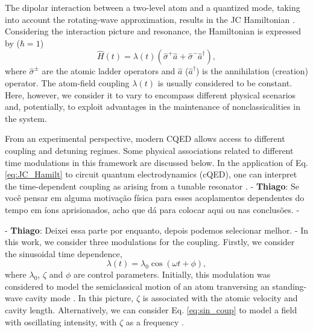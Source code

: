 \documentclass[aps,pre,superscriptaddress,twocolumn,10pt]{revtex4-2}
\newcommand{\ts}[1]{{\color{red}- \textbf{Thiago}: #1 - }}
\begin{document}
The dipolar interaction between a two-level atom and a quantized mode, taking into account the rotating-wave approximation, results in the JC Hamiltonian \cite{Scully1997,GERRY2005}.
Considering the interaction picture and resonance, the Hamiltonian is expressed by ($\hbar=1$)
\begin{equation} 
\label{eq:JC_Hamilt}
    \hat{H}(t) = 
      \lambda(t) ( \hat{\sigma}^{+}\hat{a} +
    \hat{\sigma}^{-}\hat{a}^{\dagger}), 
\end{equation}
where $\hat{\sigma}^{\pm}$ are the atomic ladder operators and $\hat{a}$ ($\hat{a}^\dagger$) is  the annihilation (creation) operator.
The atom-field coupling $\lambda(t)$ is usually considered to be constant. 
Here, however, we consider it to vary to encompass different physical scenarios and, potentially, to exploit advantages in the maintenance of nonclassicalities in the system.

From an experimental perspective, modern CQED allows access to different coupling \cite{LARSON2021} and detuning \cite{Brune1996,Sayrin2011} regimes. Some physical associations related to different time modulations in this framework are discussed below.
In the application of Eq. \eqref{eq:JC_Hamilt} to circuit quantum electrodynamics (cQED), one can interpret the time-dependent coupling as arising from a tunable resonator \cite{Maldonado-Mundo2012,Yamamoto2008,Gambetta2011,Srinivasan2011,Yin2013,Srinivasan2014,Zeytinoglu2015}.
\ts{Se você pensar em alguma motivação física para esses acoplamentos dependentes do tempo em íons aprisionados, acho que dá para colocar aqui ou nas conclusões.}

\ts{Deixei essa parte por enquanto, depois podemos selecionar melhor.}
 In this work, we consider three modulations for the coupling. 
 Firstly, we consider the sinusoidal time dependence, 
 \begin{equation} \label{eq:sin_coup}
     \lambda(t)=\lambda_0\cos(\omega t+\phi),
 \end{equation}
 where $\lambda_0$, $\zeta$ and $\phi$ are control parameters.
 Initially, this modulation was considered to model the semiclassical motion 
 of an atom tranversing an standing-wave cavity mode \cite{Schlicher1989,Wilkens1992,Fang1998,Joshi2004}. 
 In this picture, $\zeta$ is associated with the atomic velocity and cavity length. 
 Alternatively, we can consider Eq. \eqref{eq:sin_coup} to model a field with oscillating intensity, with $\zeta$ as a frequency \cite{Maldonado-Mundo2012}. 
\end{document}
